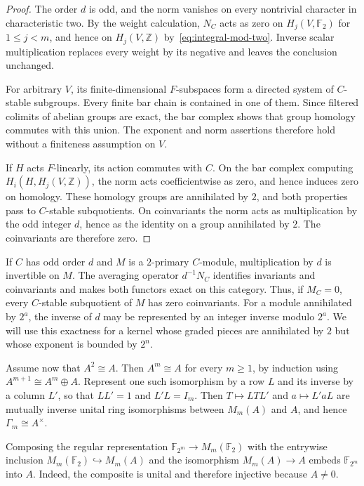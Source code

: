 \documentclass[10pt,a4paper]{amsart}
\newcommand{\Z}{\mathbb Z}
\newcommand{\F}{\mathbb F}
\numberwithin{equation}{section}
\begin{document}
\begin{proof}
The order $d$ is odd, and the norm vanishes on every nontrivial character in characteristic two. By the weight calculation, $N_C$ acts as zero on $H_j(V,\F_2)$ for $1\leq j<m$, and hence on $H_j(V,\Z)$ by~\eqref{eq:integral-mod-two}. Inverse scalar multiplication replaces every weight by its negative and leaves the conclusion unchanged.

For arbitrary $V$, its finite-dimensional $F$-subspaces form a directed system of $C$-stable subgroups. Every finite bar chain is contained in one of them. Since filtered colimits of abelian groups are exact, the bar complex shows that group homology commutes with this union. The exponent and norm assertions therefore hold without a finiteness assumption on $V$.

If $H$ acts $F$-linearly, its action commutes with $C$. On the bar complex computing $H_i(H,H_j(V,\Z))$, the norm acts coefficientwise as zero, and hence induces zero on homology. These homology groups are annihilated by $2$, and both properties pass to $C$-stable subquotients. On coinvariants the norm acts as multiplication by the odd integer $d$, hence as the identity on a group annihilated by $2$. The coinvariants are therefore zero.
\end{proof}

If $C$ has odd order $d$ and $M$ is a $2$-primary $C$-module, multiplication by $d$ is invertible on $M$. The averaging operator $d^{-1}N_C$ identifies invariants and coinvariants and makes both functors exact on this category. Thus, if $M_C=0$, every $C$-stable subquotient of $M$ has zero coinvariants. For a module annihilated by $2^a$, the inverse of $d$ may be represented by an integer inverse modulo $2^a$. We will use this exactness for a kernel whose graded pieces are annihilated by $2$ but whose exponent is bounded by $2^n$.

Assume now that $A^2\cong A$. Then $A^m\cong A$ for every $m\geq1$, by induction using $A^{m+1}\cong A^m\oplus A$. Represent one such isomorphism by a row $L$ and its inverse by a column $L'$, so that $LL'=1$ and $L'L=I_m$. Then $T\mapsto LTL'$ and $a\mapsto L'aL$ are mutually inverse unital ring isomorphisms between $M_m(A)$ and $A$, and hence $\Gamma_m\cong A^\times$.

Composing the regular representation $\F_{2^m}\to M_m(\F_2)$ with the entrywise inclusion $M_m(\F_2)\hookrightarrow M_m(A)$ and the isomorphism $M_m(A)\to A$ embeds $\F_{2^m}$ into $A$. Indeed, the composite is unital and therefore injective because $A\neq0$.
\end{document}
